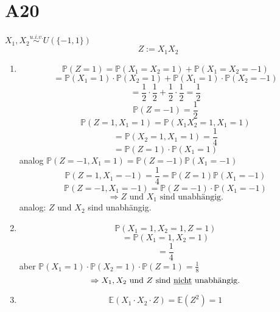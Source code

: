 \documentclass[a4paper,11pt,notitlepage]{report}
\newcommand{\Prim}{{\ensuremath{\mathbb{P}}}}
\newcommand{\E}{{\ensuremath{\mathbb{E}}}}
\begin{document}
\section{A20}
$X_1, X_2 \overset{u.i.v.}{\sim} U(\{-1,1\})$
$$Z:= X_1 X_2$$
\begin{enumerate}
	\item $$\Prim(Z=1) = \Prim(X_1 = X_2 = 1) + \Prim (X_1 = X_2 = -1)$$
	$$= \Prim(X_1 = 1) \cdot \Prim(X_2 = 1) + \Prim(X_1 = 1) \cdot \Prim(X_2 = -1)$$
	$$= \frac{1}{2} \cdot \frac{1}{2} + \frac{1}{2} \cdot \frac{1}{2} = \frac{1}{2}$$
	$$\Prim(Z=-1) = \frac{1}{2}$$
	$$\Prim(Z=1, X_1 = 1) = \Prim(X_1 X_2 = 1, X_1 = 1)$$
	$$= \Prim(X_2 = 1, X_1 = 1) = \frac{1}{4}$$
	$$= \Prim(Z=1) \cdot \Prim(X_1 = 1)$$
	analog $\Prim(Z=-1, X_1 = 1) = \Prim(Z = -1) \Prim(X_1 = -1)$
	$$\Prim(Z=1, X_1 = -1) = \frac{1}{4} = \Prim(Z=1) \Prim( X_1 = -1)$$
	$$\Prim(Z=-1, X_1 = -1) = \Prim(Z=-1) \cdot \Prim(X_1 = -1)$$
	$$\Rightarrow Z \text{ und } X_1 \text{ sind unabhängig.}$$
	analog: $Z$ und $X_2$ sind unabhängig.
	\item $$\Prim(X_1 = 1, X_2 = 1, Z=1)$$
	$$= \Prim(X_1 = 1, X_2 = 1)$$
	$$= \frac{1}{4}$$
	aber $\Prim(X_1 = 1) \cdot \Prim(X_2 = 1) \cdot \Prim(Z=1) = \frac{1}{8}$
	$$\Rightarrow X_1, X_2 \text{ und } Z \text{ sind \underline{nicht} unabhängig.}$$
	\item $$\E(X_1 \cdot X_ 2\cdot Z)= \E (Z^2) = 1$$
\end{enumerate}
\end{document}
